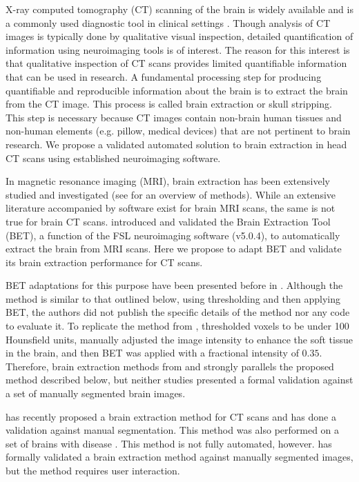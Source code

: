 \documentclass{elsarticle}\usepackage[]{graphicx}\usepackage[]{color}
\begin{document}
X-ray computed tomography (CT) scanning of the brain is widely available and is a commonly used diagnostic tool in clinical settings \citep{sahni_management_2007, chalela2007magnetic, schellinger1999standardized}. Though analysis of CT images is typically done by qualitative visual inspection, detailed quantification of information using neuroimaging tools is of interest.  The reason for this interest is that qualitative inspection of CT scans provides limited quantifiable information that can be used in research. A fundamental processing step for producing quantifiable and  reproducible information about the brain is to extract the brain from the CT image. This process is called brain extraction or skull stripping.  This step is necessary because CT images contain non-brain human tissues and non-human elements (e.g. pillow, medical devices) that are not pertinent to brain research.  We propose a validated automated solution to brain extraction in head CT scans using established neuroimaging software.

In magnetic resonance imaging (MRI), brain extraction has been extensively studied and investigated (see \citet{wang2014knowledge} for an overview of methods).  While an extensive literature accompanied by software exist for brain MRI scans, the same is not true for brain CT scans.  \citet{smith_fast_2002} introduced and validated the Brain Extraction Tool (BET), a function of the FSL \citep{jenkinson_fsl_2012} neuroimaging software (v5.0.4), to automatically extract the brain from MRI scans.  Here we propose to adapt BET and validate its brain extraction performance for CT scans.  

BET adaptations for this purpose have been presented before in \citet{solomon_user-friendly_2007}.  Although the method is similar to that outlined below, using thresholding and then applying BET, the authors did not publish the specific details of the method nor any code to evaluate it.  To replicate the method from \citet{solomon_user-friendly_2007}, \citet{rorden_age-specific_2012} thresholded voxels to be under 100 Hounsfield units, manually adjusted the image intensity to enhance the soft tissue in the brain, and then BET was applied with a fractional intensity of $0.35$.  Therefore, brain extraction methods from \citet{rorden_age-specific_2012} and \citet{solomon_user-friendly_2007} strongly parallels the proposed method described below, but neither studies presented a formal validation against a set of manually segmented brain images.  

\citet{mandell2014volumetric1} has recently proposed a brain extraction method for CT scans and has done a validation against manual segmentation.  This method was also performed on a set of brains with disease \citep{mandell2014volumetric2, mandell2014volumetric3}.  This method is not fully automated, however.   \citet{mandell2014volumetric1} has formally validated a brain extraction method against manually segmented images, but the method requires user interaction.  
\end{document}
